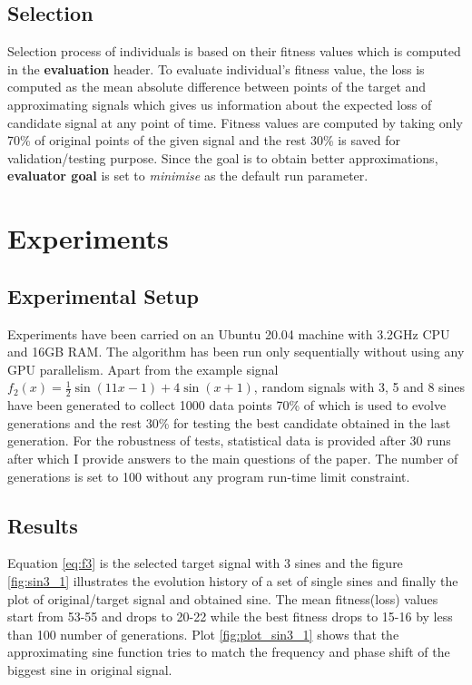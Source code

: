 \documentclass[conference]{IEEEtran}
\begin{document}
\subsection{Selection}
Selection process of individuals is based on their fitness values which is computed in the \textbf{evaluation} header. To evaluate individual's fitness value, the loss is computed as the mean absolute difference 
between points of the target and approximating signals which gives us information about the expected loss of candidate signal at any point of time. Fitness values are computed by taking only 70\% of original 
points of the given signal and the rest 30\% is saved for validation/testing purpose. Since the goal is to obtain better approximations, \textbf{evaluator goal} is set to \textit{minimise} as the default run 
parameter.

\section{Experiments}
\subsection{Experimental Setup}
Experiments have been carried on an Ubuntu 20.04 machine with 3.2GHz CPU and 16GB RAM. The algorithm has been run only sequentially without using any GPU parallelism. Apart from the example signal 
$f_2(x) = \frac{1}{2}\sin(11x-1) + 4\sin(x+1)$, random signals with 3, 5 and 8 sines have been generated to collect 1000 data points 70\% of which is used to evolve generations and the rest 30\% for 
testing the best candidate obtained in the last generation. For the robustness of tests, statistical data is provided after 30 runs after which I provide answers to the main questions of the paper.
The number of generations is set to 100 without any program run-time limit constraint.

\subsection{Results}
Equation \ref{eq:f3} is the selected target signal with 3 sines and the figure \ref{fig:sin3_1} illustrates the evolution history of a set of single sines and finally the plot of original/target signal and 
obtained sine. The mean fitness(loss) values start from 53-55 and drops to 20-22 while the best fitness drops to 15-16 by less than 100 number of generations. Plot \ref{fig:plot_sin3_1} shows that
the approximating sine function tries to match the frequency and phase shift of the biggest sine in original signal.
\end{document}
